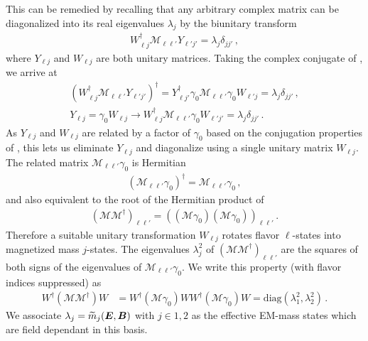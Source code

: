 This can be remedied by recalling that any arbitrary complex matrix can be diagonalized into its real eigenvalues $\lambda_{j}$ by the biunitary transform
\begin{align}
\label{biunitary:1}
W_{\ell j}^{\dag}\mathcal{M}_{\ell\ell'}Y_{\ell'j'}=\lambda_{j}\delta_{jj'}\,,
\end{align}
where $Y_{\ell j}$ and $W_{\ell j}$ are both unitary matrices. Taking the complex conjugate of , we arrive at
\begin{align}
\label{biunitary:2}
(W_{\ell j}^{\dag}\mathcal{M}_{\ell\ell'}Y_{\ell'j'})^{\dag} = 
Y_{\ell j'}^{\dag}\gamma_{0}\mathcal{M}_{\ell\ell'}\gamma_{0}W_{\ell' j}=\lambda_{j}\delta_{jj'}\,,\\
Y_{\ell j}=\gamma_{0}W_{\ell j}\rightarrow
W_{\ell j}^{\dag}\mathcal{M}_{\ell\ell'}\gamma_{0}W_{\ell'j'}=\lambda_{j}\delta_{jj'}\,. 
\end{align}
As $Y_{\ell j}$ and $W_{\ell j}$ are related by a factor of $\gamma_{0}$ based on the conjugation properties of , this lets us eliminate $Y_{\ell j}$ and diagonalize using a single unitary matrix $W_{\ell j}$. The related matrix $\mathcal{M}_{\ell\ell'}\gamma_{0}$ is Hermitian
\begin{align}
\label{herm:1}
(\mathcal{M}_{\ell\ell'}\gamma_{0})^{\dag} = \mathcal{M}_{\ell\ell'}\gamma_{0}\,,
\end{align}
and also equivalent to the root of the Hermitian product of 
\begin{align}
(\mathcal{M}\mathcal{M}^{\dag})_{\ell\ell'} = \left((\mathcal{M}\gamma_{0})(\mathcal{M}\gamma_{0})\right)_{\ell\ell'}\,.
\end{align}
Therefore a suitable unitary transformation $W_{\ell j}$ rotates flavor $\ell$-states into magnetized mass $j$-states. The eigenvalues $\lambda_{j}^{2}$ of $(\mathcal{M}\mathcal{M}^{\dag})_{\ell\ell'}$ are the squares of both signs of the eigenvalues of $\mathcal{M}_{\ell\ell'}\gamma_{0}$. We write this property (with flavor indices suppressed) as
\begin{align}
W^{\dag}(\mathcal{M}\mathcal{M}^{\dag})W &= W^{\dag}(\mathcal{M}\gamma_{0})WW^{\dag}(\mathcal{M}\gamma_{0})W = \mathrm{diag}(\lambda_{1}^{2},\lambda_{2}^{2})\,.
\end{align}
We associate $\lambda_{j}=\widetilde m_{j}(\boldsymbol{E},\boldsymbol{B})$ with $j\in1,2$ as the effective EM-mass states which are field dependant in this basis. 

